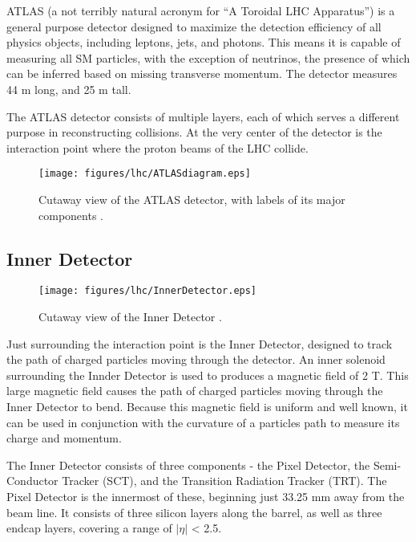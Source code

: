 ATLAS (a not terribly natural acronym for ``A Toroidal LHC Apparatus'') is a general purpose detector designed to maximize the detection efficiency of all physics objects, including leptons, jets, and photons. This means it is capable of measuring all SM particles, with the exception of neutrinos, the presence of which can be inferred based on missing transverse momentum. The detector measures 44 m long, and 25 m tall. 

The ATLAS detector consists of multiple layers, each of which serves a different purpose in reconstructing collisions. At the very center of the detector is the interaction point where the proton beams of the LHC collide. 

\begin{figure}[H]
\centering
   \texttt{[image: figures/lhc/ATLASdiagram.eps]}
\caption{Cutaway view of the ATLAS detector, with labels of its major components \cite{ATLAS_figure}.}
\label{fig:ATLAS}
\end{figure}

\subsection{Inner Detector}
\label{sec:innerDetector}

\begin{figure}[H]
\centering
   \texttt{[image: figures/lhc/InnerDetector.eps]}
\caption{Cutaway view of the Inner Detector \cite{caloFig}.}
\label{fig:innerDect}
\end{figure}

Just surrounding the interaction point is the Inner Detector, designed to track the path of charged particles moving through the detector. An inner solenoid surrounding the Innder Detector is used to produces a magnetic field of 2 T. This large magnetic field causes the path of charged particles moving through the Inner Detector to bend. Because this magnetic field is uniform and well known, it can be used in conjunction with the curvature of a particles path to measure its charge and momentum.

The Inner Detector consists of three components - the Pixel Detector, the Semi-Conductor Tracker (SCT), and the Transition Radiation Tracker (TRT). The Pixel Detector is the innermost of these, beginning just 33.25 mm away from the beam line. It consists of three silicon layers along the barrel, as well as three endcap layers, covering a range of $|\eta|$ < 2.5. 

